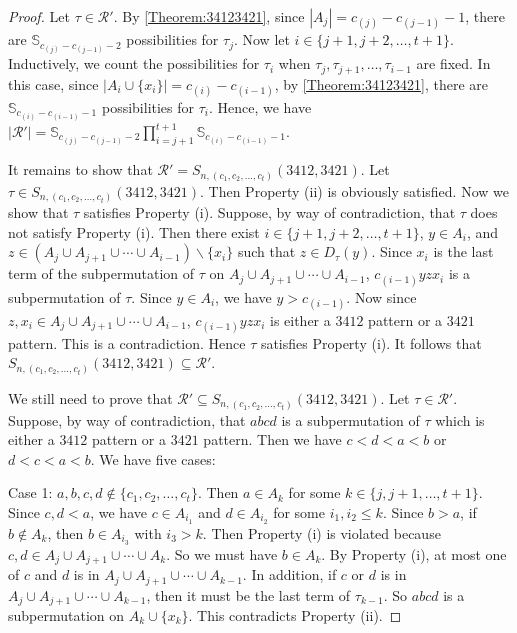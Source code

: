 \documentclass[11pt]{article}
\theoremstyle{definition}
\numberwithin{equation}{section}
\begin{document}
\begin{proof}
    Let $\tau\in\mathcal{R}'$. By \cref{Theorem:34123421}, since $|A_j|=c_{(j)}-c_{(j-1)}-1$, there are $\mathbb{S}_{c_{(j)}-c_{(j-1)}-2}$ possibilities for $\tau_j$. Now let $i\in\{j+1,j+2,\ldots,t+1\}$. Inductively, we count the possibilities for $\tau_i$ when $\tau_j,\tau_{j+1},\ldots,\tau_{i-1}$ are fixed. In this case, since $|A_i\cup\{x_i\}|=c_{(i)}-c_{(i-1)}$, by \cref{Theorem:34123421}, there are $\mathbb{S}_{c_{(i)}-c_{(i-1)}-1}$ possibilities for $\tau_i$. Hence, we have $|\mathcal{R}'|=\mathbb{S}_{c_{(j)}-c_{(j-1)}-2}\prod_{i=j+1}^{t+1}\mathbb{S}_{c_{(i)}-c_{(i-1)}-1}$.

    It remains to show that $\mathcal{R}'=S_{n,(c_1,c_2,\ldots,c_t)}(3412,3421)$. Let $\tau\in S_{n,(c_1,c_2,\ldots,c_t)}(3412,3421)$. Then Property (ii) is obviously satisfied. Now we show that $\tau$ satisfies Property (i). Suppose, by way of contradiction, that $\tau$ does not satisfy Property (i). Then there exist $i\in\{j+1,j+2,\ldots,t+1\}$, $y\in A_i$, and $z\in (A_j\cup A_{j+1}\cup\cdots \cup A_{i-1})\backslash\{x_i\}$ such that $z\in D_\tau(y)$. Since $x_i$ is the last term of the subpermutation of $\tau$ on $A_j\cup A_{j+1}\cup\cdots\cup A_{i-1}$, $c_{(i-1)}yzx_i$ is a subpermutation of $\tau$. Since $y\in A_i$, we have $y>c_{(i-1)}$. Now since $z,x_i\in A_j\cup A_{j+1}\cup\cdots \cup A_{i-1}$, $c_{(i-1)}yzx_i$ is either a $3412$ pattern or a $3421$ pattern. This is a contradiction. Hence $\tau$ satisfies Property (i). It follows that $S_{n,(c_1,c_2,\ldots,c_t)}(3412,3421)\subseteq\mathcal{R}'$. 

    We still need to prove that $\mathcal{R}'\subseteq S_{n,(c_1,c_2,\ldots,c_t)}(3412,3421)$. Let $\tau\in \mathcal{R}'$. Suppose, by way of contradiction, that $abcd$ is a subpermutation of $\tau$ which is either a $3412$ pattern or a $3421$ pattern. Then we have $c<d<a<b$ or $d<c<a<b$. We have five cases:

    Case 1: $a,b,c,d\notin\{c_1,c_2,\ldots,c_t\}$. Then $a\in A_k$ for some $k\in\{j,j+1,\ldots,t+1\}$. Since $c,d<a$, we have $c\in A_{i_1}$ and $d\in A_{i_2}$ for some $i_1,i_2\leq k$. Since $b>a$, if $b\notin A_k$, then $b\in A_{i_3}$ with $i_3>k$. Then Property (i) is violated because $c,d\in A_j\cup A_{j+1}\cup\cdots\cup A_{k}$. So we must have $b\in A_k$. By Property (i), at most one of $c$ and $d$ is in $A_j\cup A_{j+1}\cup\cdots\cup A_{k-1}$. In addition, if $c$ or $d$ is in $A_j\cup A_{j+1}\cup\cdots\cup A_{k-1}$, then it must be the last term of $\tau_{k-1}$. So $abcd$ is a subpermutation on $A_k\cup\{x_k\}$. This contradicts Property (ii).
    

\end{proof}
\end{document}

